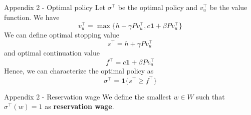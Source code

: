 \documentclass[aspectratio=169]{beamer} %
\begin{document}
\begin{frame}{Appendix 2 - Optimal policy}
Let $\sigma^\top$ be the optimal policy and $v_u^\top$ be the value function. We have
$$
v_u^\top = \max\{h+\gamma Pv_u^\top, c\mathbf{1} + \beta Pv_u^\top\}
$$
We can define optimal stopping value
$$
s^\top = h+\gamma Pv_u^\top
$$
and 
optimal continuation value
$$
f^\top = c\mathbf{1}+\beta Pv_u^\top
$$
Hence, we can characterize the optimal policy as
$$
\sigma^\top = \mathbf{1}{\{s^\top\ge f^\top\}}
$$
\end{frame}
\begin{frame}{Appendix 2 - Reservation wage}
We define the smallest $w\in W$ such that $\sigma^\top (w) =1$ as \textbf{reservation wage}.
    
\end{frame}
\end{document}
